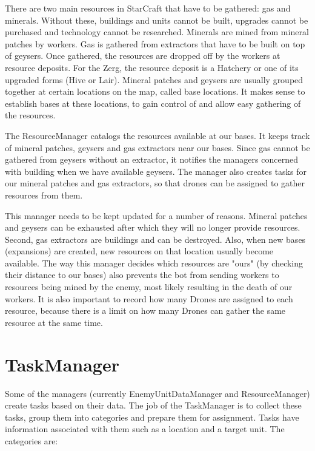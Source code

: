 There are two main resources in StarCraft that have to be gathered: gas and minerals. Without these, buildings and units cannot be built, upgrades cannot be purchased and technology cannot be researched. Minerals are mined from mineral patches by workers. Gas is gathered from extractors that have to be built on top of geysers. Once gathered, the resources are dropped off by the workers at resource deposits. For the Zerg, the resource deposit is a Hatchery or one of its upgraded forms (Hive or Lair). Mineral patches and geysers are usually grouped together at certain locations on the map, called base locations. It makes sense to establish bases at these locations, to gain control of and allow easy gathering of the resources.

The ResourceManager catalogs the resources available at our bases. It keeps track of mineral patches, geysers and gas extractors near our bases. Since gas cannot be gathered from geysers without an extractor, it notifies the managers concerned with building when we have available geysers. The manager also creates tasks for our mineral patches and gas extractors, so that drones can be assigned to gather resources from them.

This manager needs to be kept updated for a number of reasons. Mineral patches and geysers can be exhausted after which they will no longer provide resources. Second, gas extractors are buildings and can be destroyed. Also, when new bases (expansions) are created, new resources on that location usually become available. The way this manager decides which resources are "ours" (by checking their distance to our bases) also prevents the bot from sending workers to resources being mined by the enemy, most likely resulting in the death of our workers. It is also important to record how many Drones are assigned to each resource, because there is a limit on how many Drones can gather the same resource at the same time.

\section{TaskManager}

Some of the managers (currently EnemyUnitDataManager and ResourceManager) create tasks based on their data. The job of the TaskManager is to collect these tasks, group them into categories and prepare them for assignment. Tasks have information associated with them such as a location and a target unit. The categories are:

